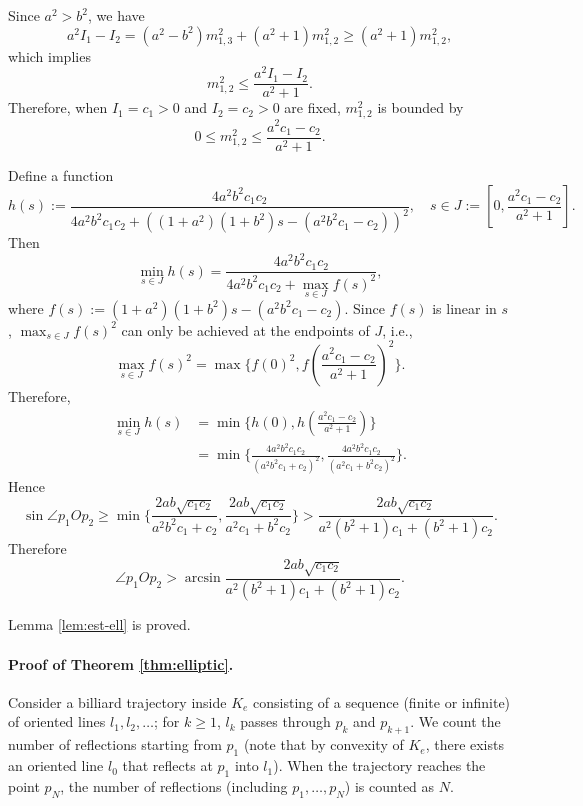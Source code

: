 \documentclass[12pt]{article}
\begin{document}
Since $a^2>b^2$, we have
$$
a^2 I_1-I_2 = (a^2-b^2) m_{1,3}^2 + (a^2 +1 )m_{1,2}^2 \geq (a^2 +1 )m_{1,2}^2,
$$
which implies
$$
m_{1,2}^2 \leq \frac{a^2 I_1-I_2}{a^2 +1}.
$$
Therefore, when $I_1=c_1>0$ and $I_2=c_2>0$ are fixed, $m_{1,2}^2$ is bounded by
$$
0 \leq m_{1,2}^2 \leq  \frac{a^2c_1 -c_2}{a^2 +1}.
$$

Define a function
$$
h(s) :=  \frac {4 a^2 b^2 c_1 c_2}{4 a^2 b^2 c_1 c_2 + \left( (1+a^2)(1+b^2)s - ( a^2 b^2 c_1-c_2) \right)^2}, \quad
s\in J:=\left[0, \frac{a^2c_1 -c_2}{a^2 +1}\right].
$$
Then
\begin{equation*}
\min_{s\in J} h(s) 
=
\frac {4 a^2 b^2 c_1 c_2}{4 a^2 b^2 c_1 c_2 + \max_{s\in J} f(s)^2},
\end{equation*}
where $f(s):=(1+a^2)(1+b^2)s - (a^2 b^2 c_1-c_2)$. Since $f(s)$ is linear in $s$, 
$\max_{s\in J} f(s)^2$ can only be achieved at the endpoints of $J$, i.e.,
$$
\max_{s\in J} f(s)^2 = \max\{f(0)^2, f(\frac{a^2c_1 -c_2}{a^2 +1})^2\}.
$$
Therefore,
\begin{equation*}
\begin{split}
\min_{s\in J} h(s) 
&= \min \{ h(0), h(\frac{a^2c_1-c_2}{a^2 +1})\} \\
&= \min \{ \frac{4 a^2 b^2 c_1 c_2}{(a^2 b^2 c_1 + c_2)^2}, \frac{4 a^2 b^2 c_1 c_2}{(a^2 c_1 + b^2 c_2)^2}\}.
\end{split}
\end{equation*}
Hence
$$
\sin \angle p_1 O p_2 
 \geq \min
 \{ 
  \frac{2 a b \sqrt{c_1 c_2}}{a^2 b^2 c_1 + c_2}, 
 \frac{2 a b \sqrt{c_1 c_2}}{a^2 c_1 + b^2 c_2} 
 \}
>
\frac{2 a b \sqrt{c_1 c_2}}{a^2(b^2+1)c_1 + (b^2+1)c_2}.
$$
Therefore
$$
  \angle p_1 O p_2 
  > \arcsin 
  \frac{2 a b \sqrt{c_1 c_2}}{a^2(b^2+1)c_1 + (b^2+1)c_2}.
$$

Lemma \ref{lem:est-ell} is proved.

\vspace*{1em}

\paragraph{Proof of Theorem \ref{thm:elliptic}.}
Consider a billiard trajectory inside $K_e$ consisting of a sequence (finite or infinite) of oriented lines $l_1, l_2, \ldots$;
for $k \geq 1$, $l_k$ passes through $p_k$ and $p_{k+1}$.
We count the number of reflections starting from $p_1$ (note that by convexity of $K_e$, there exists an oriented line $l_0$ that reflects at $p_1$ into $l_1$). 
When the trajectory reaches the point $p_N$, the number of reflections (including $p_1, \ldots, p_N$) is counted as $N$.
\end{document}
